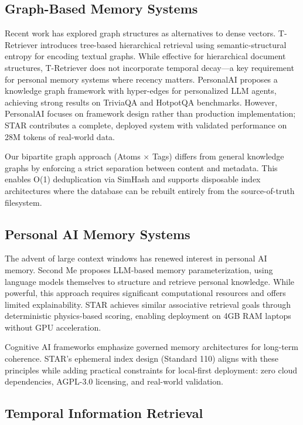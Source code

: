 \documentclass[11pt]{article}
\begin{document}
\subsection{Graph-Based Memory Systems}

Recent work has explored graph structures as alternatives to dense vectors. T-Retriever \cite{wei2026tretriever} introduces tree-based hierarchical retrieval using semantic-structural entropy for encoding textual graphs. While effective for hierarchical document structures, T-Retriever does not incorporate temporal decay---a key requirement for personal memory systems where recency matters. PersonalAI \cite{menschikov2025personalai} proposes a knowledge graph framework with hyper-edges for personalized LLM agents, achieving strong results on TriviaQA and HotpotQA benchmarks. However, PersonalAI focuses on framework design rather than production implementation; STAR contributes a complete, deployed system with validated performance on 28M tokens of real-world data.

Our bipartite graph approach (Atoms $\times$ Tags) differs from general knowledge graphs by enforcing a strict separation between content and metadata. This enables O(1) deduplication via SimHash \cite{charikar2002similar} and supports disposable index architectures where the database can be rebuilt entirely from the source-of-truth filesystem.

\subsection{Personal AI Memory Systems}

The advent of large context windows has renewed interest in personal AI memory. Second Me \cite{wei2025second} proposes LLM-based memory parameterization, using language models themselves to structure and retrieve personal knowledge. While powerful, this approach requires significant computational resources and offers limited explainability. STAR achieves similar associative retrieval goals through deterministic physics-based scoring, enabling deployment on 4GB RAM laptops without GPU acceleration.

Cognitive AI frameworks \cite{salas2025cognitive} emphasize governed memory architectures for long-term coherence. STAR's ephemeral index design (Standard 110) aligns with these principles while adding practical constraints for local-first deployment: zero cloud dependencies, AGPL-3.0 licensing, and real-world validation.

\subsection{Temporal Information Retrieval}
\end{document}
